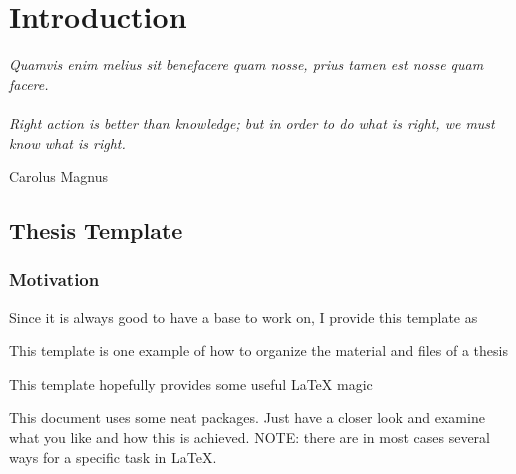 \chapter{Introduction}
\epigraph{
	\textit{Quamvis enim melius sit benefacere quam nosse, prius tamen est nosse quam facere.} \\
	\hspace{1ex}\\
	\textit{Right action is better than knowledge; but in order to do what is right, we must know what is right.}
}{Carolus Magnus}



\section{Thesis Template}

\subsection{Motivation}

Since it is always good to have a base to work on, I provide this template as




\begin{mydescription}
	\item[Organisation] This template is one example of how to organize the 
		material and files of a thesis
	\item[\LaTeX{} magic] This template hopefully provides some useful \LaTeX{} magic
	\item[Useful packages] This document uses some neat packages. Just have a closer look 
		and examine what you like and how this is achieved. NOTE: there are in most 
		cases several ways for a specific task in \LaTeX{}.
\end{mydescription}




